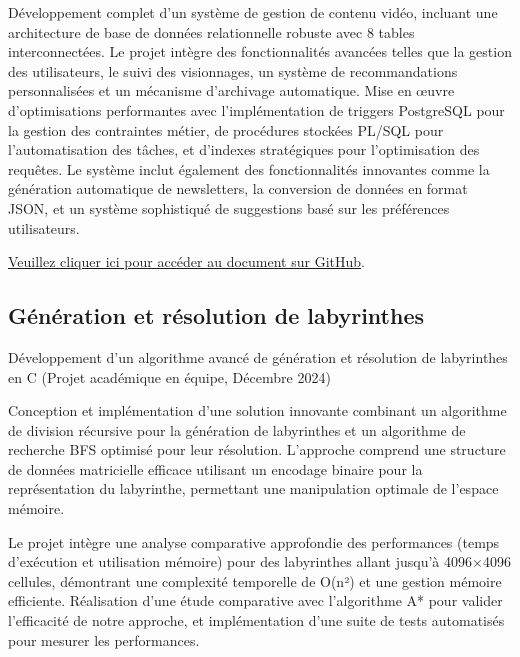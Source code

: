 \documentclass{article}
\begin{document}
    Développement complet d'un système de gestion de contenu vidéo, incluant une architecture de base de données relationnelle robuste avec 8 tables interconnectées. Le projet intègre des fonctionnalités avancées telles que la gestion des utilisateurs, le suivi des visionnages, un système de recommandations personnalisées et un mécanisme d'archivage automatique. Mise en œuvre d'optimisations performantes avec l'implémentation de triggers PostgreSQL pour la gestion des contraintes métier, de procédures stockées PL/SQL pour l'automatisation des tâches, et d'indexes stratégiques pour l'optimisation des requêtes. Le système inclut également des fonctionnalités innovantes comme la génération automatique de newsletters, la conversion de données en format JSON, et un système sophistiqué de suggestions basé sur les préférences utilisateurs.
    \newline
    \newline
    \newline

    \href{https://github.com/jafarizadeh/CV---lettre/tree/a64fa195620766a9cf39fd42a2fd963779d13f6f/Document/Projets/Co-author}{Veuillez cliquer ici pour accéder au document sur GitHub}.

    \newpage
    
    \subsection{Génération et résolution de labyrinthes}
    Développement d'un algorithme avancé de génération et résolution de labyrinthes en C (Projet académique en équipe, Décembre 2024)


    Conception et implémentation d'une solution innovante combinant un algorithme de division récursive pour la génération de labyrinthes et un algorithme de recherche BFS optimisé pour leur résolution. L'approche comprend une structure de données matricielle efficace utilisant un encodage binaire pour la représentation du labyrinthe, permettant une manipulation optimale de l'espace mémoire. 
    
    Le projet intègre une analyse comparative approfondie des performances (temps d'exécution et utilisation mémoire) pour des labyrinthes allant jusqu'à 4096×4096 cellules, démontrant une complexité temporelle de O(n²) et une gestion mémoire efficiente. Réalisation d'une étude comparative avec l'algorithme A* pour valider l'efficacité de notre approche, et implémentation d'une suite de tests automatisés pour mesurer les performances.
    \newline
    \newline
    \newline
    
\end{document}

